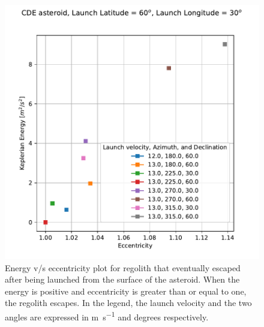 \begin{figure}[htb]
\centering
\captionsetup{justification=centering}
\includegraphics[width=\textwidth, height=0.4\textheight, keepaspectratio=true]{Images/escape_vv.pdf}
\caption{Energy v/s eccentricity plot for regolith that eventually escaped after being launched from the surface of the asteroid. When the energy is positive and eccentricity is greater than or equal to one, the regolith escapes. In the legend, the launch velocity and the two angles are expressed in \si{\metre \per \second} and degrees respectively.}
\label{fig:finalfate_vv_escape}
\end{figure}
\FloatBarrier
